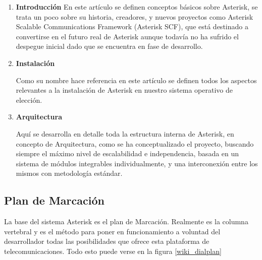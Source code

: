 \begin{enumerate}
	  \setlength{\itemsep}{10pt}

	\item \textbf{Introducción}
	En este artículo se definen conceptos básicos sobre Asterisk, se trata un poco sobre su historia, creadores, y nuevos proyectos como Asterisk Scalable Communications Framework (Asterisk SCF), que está destinado a convertirse en el futuro real de Asterisk aunque todavía no ha sufrido el despegue inicial dado que se encuentra en fase de desarrollo.
	
	\item \textbf{Instalación}
	
	Como su nombre hace referencia en este artículo se definen todos los aspectos relevantes a la instalación de Asterisk en nuestro sistema operativo de elección.
	
	\item \textbf{Arquitectura}
	
	Aquí se desarrolla en detalle toda la estructura interna de Asterisk, en concepto de Arquitectura, como se ha conceptualizado el proyecto, buscando siempre el máximo nivel de escalabilidad e independencia, basada en un sistema de módulos integrables individualmente, y una interconexión entre los mismos con metodología estándar.
	
\end{enumerate}


\subsection{Plan de Marcación}

La base del sistema Asterisk es el plan de Marcación. Realmente es la columna vertebral y es el método para poner en funcionamiento a voluntad del desarrollador todas las posibilidades que ofrece esta plataforma de telecomunicaciones. Todo esto puede verse en la figura \ref{wiki_dialplan}

